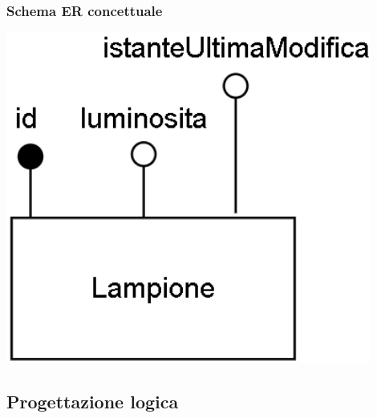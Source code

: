 \subsubsection{Schema ER concettuale}

\begin{center}
    \includegraphics[width=12cm]{contenuti/specifica-basi-dati/img-sbd/coordinazione_concettuale.png}
\end{center}

\subsection{Progettazione logica}